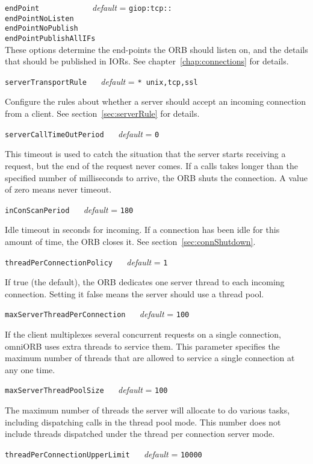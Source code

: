 \documentclass[11pt,twoside,a4paper]{book}
\makeatletter
\newcommand{\code}[1]{\texttt{#1}}
\newcommand{\confopt}[2]
  {\vspace{\baselineskip}\par\noindent\code{#1} ~~ \textit{default} =
   \code{#2}}
\renewcommand{\confopt}[2]
  {\vspace{\baselineskip}\par\noindent\code{#1} ~~ \textit{default} =
   \code{#2}\\[-1ex]\@afterheading}
\makeatother
\begin{document}
\noindent
\code{endPoint~~~~~~~~~} ~~ \textit{default} = \code{giop:tcp::}\\
\code{endPointNoListen}\\
\code{endPointNoPublish}\\
\code{endPointPublishAllIFs}\\[.1ex]

\noindent
These options determine the end-points the ORB should listen on, and
the details that should be published in IORs. See
chapter~\ref{chap:connections} for details.



\confopt{serverTransportRule}{* unix,tcp,ssl}

Configure the rules about whether a server should accept an incoming
connection from a client. See section~\ref{sec:serverRule} for
details.


\confopt{serverCallTimeOutPeriod}{0}

This timeout is used to catch the situation that the server starts
receiving a request, but the end of the request never comes. If a
calls takes longer than the specified number of milliseconds to
arrive, the ORB shuts the connection. A value of zero means never
timeout.


\confopt{inConScanPeriod}{180}

Idle timeout in seconds for incoming. If a connection has been idle
for this amount of time, the ORB closes it. See
section~\ref{sec:connShutdown}.


\confopt{threadPerConnectionPolicy}{1}

If true (the default), the ORB dedicates one server thread to each
incoming connection. Setting it false means the server should use a
thread pool.


\confopt{maxServerThreadPerConnection}{100}

If the client multiplexes several concurrent requests on a single
connection, omniORB uses extra threads to service them. This parameter
specifies the maximum number of threads that are allowed to service a
single connection at any one time.


\confopt{maxServerThreadPoolSize}{100}

The maximum number of threads the server will allocate to do various
tasks, including dispatching calls in the thread pool mode. This
number does not include threads dispatched under the thread per
connection server mode.


\confopt{threadPerConnectionUpperLimit}{10000}
\end{document}
